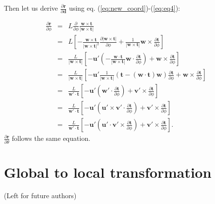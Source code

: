 \documentclass[12pt,a4paper]{scrarticle}
\begin{document}
Then let us derive $\frac{\partial{\mathbf{r} } }{\partial{\mathbf{d} }}$ using eq. (\ref{eq:new_coord})-(\ref{eq:eq4}):

\begin{eqnarray}
    \frac{\partial{\mathbf{r}}}{\partial \phi} & = &  L \frac{\partial}{\partial \phi} \frac{\mathbf{w} \times \mathbf{t}}{|\mathbf{w} \times \mathbf{t}|} \nonumber \\
    & = & L \left[ - \frac{\mathbf{w} \times \mathbf{t}}{|\mathbf{w} \times \mathbf{t}|^2} \frac{\partial |\mathbf{w} \times \mathbf{t}|}{\partial \phi} + \frac{1}{|\mathbf{w} \times \mathbf{t}|} \mathbf{w} \times \frac{\partial \mathbf{t}}{\partial \phi} \right] \nonumber \\
    & = & \frac{L}{|\mathbf{w} \times \mathbf{t}|}\left[ -\mathbf{u}' \left( -\frac{\mathbf{w} \cdot \mathbf{t}}{|\mathbf{w} \times \mathbf{t}|} \mathbf{w} \cdot \frac{\partial \mathbf{t}}{\partial \phi} \right)  + \mathbf{w} \times \frac{\partial \mathbf{t}}{\partial \phi}  \right] \nonumber \\
    & = & \frac{L}{|\mathbf{w} \times \mathbf{t}|}\left[ -\mathbf{u}' \frac{1}{|\mathbf{w} \times \mathbf{t}|} \left( \mathbf{t} - (\mathbf{w} \cdot \mathbf{t})\mathbf{w} \right) \frac{\partial \mathbf{t}}{\partial \phi} + \mathbf{w} \times \frac{\partial \mathbf{t}}{\partial \phi}  \right] \nonumber \\
    & = & \frac{L}{\mathbf{w}' \cdot \mathbf{t}}\left[ -\mathbf{u}' \left( \mathbf{w}' \cdot \frac{\partial \mathbf{t}}{\partial \phi} \right)  + \mathbf{v}' \times \frac{\partial \mathbf{t}}{\partial \phi}  \right] \nonumber \\
    & = & \frac{L}{\mathbf{w}' \cdot \mathbf{t}}\left[ -\mathbf{u}' \left( \mathbf{u}' \times \mathbf{v}' \cdot \frac{\partial \mathbf{t}}{\partial \phi} \right)  + \mathbf{v}' \times \frac{\partial \mathbf{t}}{\partial \phi}  \right] \nonumber \\   
    & = & \frac{L}{\mathbf{w}' \cdot \mathbf{t}}\left[ -\mathbf{u}' \left( \mathbf{u}' \cdot \mathbf{v}' \times \frac{\partial \mathbf{t}}{\partial \phi} \right)  + \mathbf{v}' \times \frac{\partial \mathbf{t}}{\partial \phi}  \right].    
\end{eqnarray}
$\frac{\partial \mathbf{r}}{\partial \theta}$ follows the same equation.

\section{Global to local transformation}
(Left for future authors)
\end{document}
